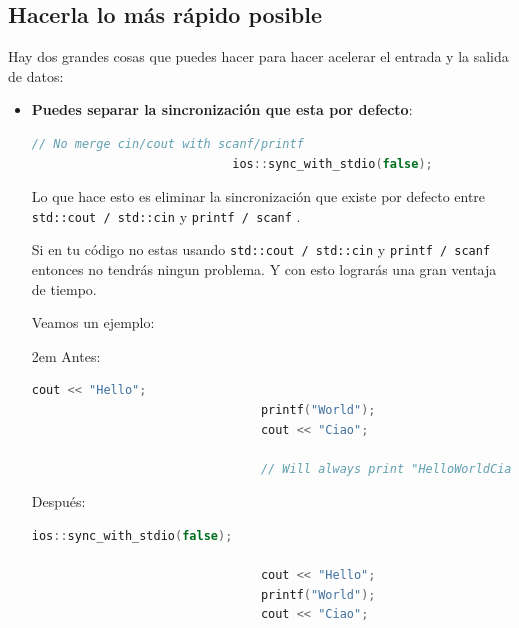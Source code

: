 \documentclass[12pt, fleqn]{report}                             %
\newenvironment{Indentation}[1][0.75em]                         %
        {\begin{adjustwidth}{#1}{}}                                 %
        {\end{adjustwidth}}                                         %
\theoremstyle{break}                                            %
\newcommand{\textCode}[1]  { \texttt{#1} }                      %
\begin{document}
            \subsection{Hacerla lo más rápido posible}

                Hay dos grandes cosas que puedes hacer para hacer acelerar el entrada y la salida
                de datos:
                \begin{itemize}
                    \item \textbf{Puedes separar la sincronización que esta por defecto}:
                        \begin{lstlisting}[language=C++, gobble=28]
                            // No merge cin/cout with scanf/printf
                            ios::sync_with_stdio(false);   
                        \end{lstlisting}

                        Lo que hace esto es eliminar la sincronización que existe por defecto entre 
                        \textCode{std::cout / std::cin} y \textCode{printf / scanf}. 
                        
                        Si en tu código no estas usando \textCode{std::cout / std::cin} y \textCode{printf / scanf}
                        entonces no tendrás ningun problema. Y con esto lograrás una gran ventaja de tiempo.

                        Veamos un ejemplo:

                        \begin{Indentation}[2em] 
                            Antes:
                            \begin{lstlisting}[language=C++, gobble=32]
                                cout << "Hello";
                                printf("World");
                                cout << "Ciao";  

                                // Will always print "HelloWorldCiao"
                            \end{lstlisting}

                            Después:
                            \begin{lstlisting}[language=C++, gobble=32]
                                ios::sync_with_stdio(false);   

                                cout << "Hello";
                                printf("World");
                                cout << "Ciao";  


\end{lstlisting}
\end{Indentation}
\end{itemize}
\end{document}
